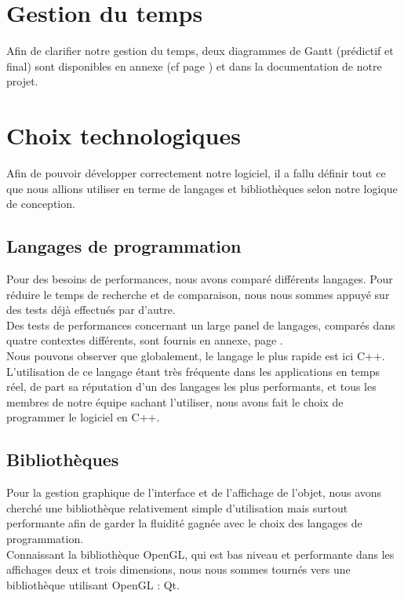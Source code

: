 \documentclass[a4paper]{memoir}
\begin{document}
		\section{Gestion du temps}
			\label{GestionTps}
			Afin de clarifier notre gestion du temps, deux diagrammes de Gantt (prédictif et final) sont disponibles en annexe (cf page \pageref{fig:gantt}) 
			et dans la documentation de notre projet.

		\section{Choix technologiques}
			Afin de pouvoir développer correctement notre logiciel, il a fallu définir tout ce que nous allions utiliser en terme de langages et 
			bibliothèques selon notre logique de conception.
			
			\subsection{Langages de programmation}
				Pour des besoins de performances, nous avons comparé différents langages. Pour réduire le temps de recherche et de comparaison, nous nous 
				sommes appuyé sur des tests déjà effectués par d'autre.\\ Des tests de performances concernant un large panel de langages, comparés dans 
				quatre contextes différents, sont fournis en annexe, page \pageref{fig:analyse}.\\ Nous pouvons observer que globalement, le langage le plus 
				rapide est ici C++. L'utilisation de ce langage étant très fréquente dans les applications en temps réel, de part sa réputation d'un des 
				langages les plus performants, et tous les membres de notre équipe sachant l'utiliser, nous avons fait le choix de programmer le logiciel en 
				C++.\\

			\subsection{Bibliothèques}
				Pour la gestion graphique de l'interface et de l'affichage de l'objet, nous avons cherché une bibliothèque relativement simple d'utilisation 
				mais surtout performante afin de garder la fluidité gagnée avec le choix des langages de programmation.\\ Connaissant la bibliothèque 
				OpenGL, qui est bas niveau et performante dans les affichages deux et trois dimensions, nous nous sommes tournés vers une bibliothèque 
				utilisant OpenGL : Qt.\\
\end{document}
